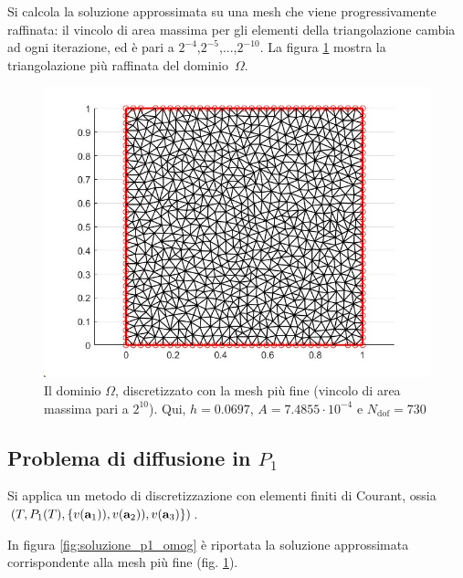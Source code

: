 \documentclass[%
	corpo=11pt,
    twoside,
    stile=classica,
    oldstyle,
    tipotesi=custom,
    greek,
    evenboxes,
]{toptesi}
\begin{document}
Si calcola la soluzione approssimata su una mesh che viene progressivamente raffinata: il vincolo di area massima per gli elementi della triangolazione cambia ad ogni iterazione, ed è pari a $2^{-4}$,$2^{-5}$,...,$2^{-10}$. La figura \ref{fig:mesh} mostra la triangolazione più raffinata del dominio~$\Omega$.
\begin{figure}[htbp]
  \centering
    \includegraphics[scale=0.4]{Pictures/triangolazione_2allameno10.jpg}
    \caption{Il dominio $\Omega$, discretizzato con la mesh più fine  (vincolo di area massima pari a $2^{10}$). Qui, $h=0.0697$, $A=7.4855 \cdot 10^{-4}$ e $N_{\text{dof}}=730$}
    \label{fig:mesh}
    \end{figure}


 \subsection{Problema di diffusione  in $P_1$}\label{sez-p1-omog}
Si applica  un metodo di discretizzazione con elementi finiti di Courant, ossia $(T, P_1(T),\\ \{v(\textbf{a}_1)),v(\textbf{a}_2)),v(\textbf{a}_3)\})$.

In figura \ref{fig:soluzione_p1_omog} è riportata la  soluzione approssimata corrispondente alla mesh più fine (fig. \ref{fig:mesh}).
\end{document}
